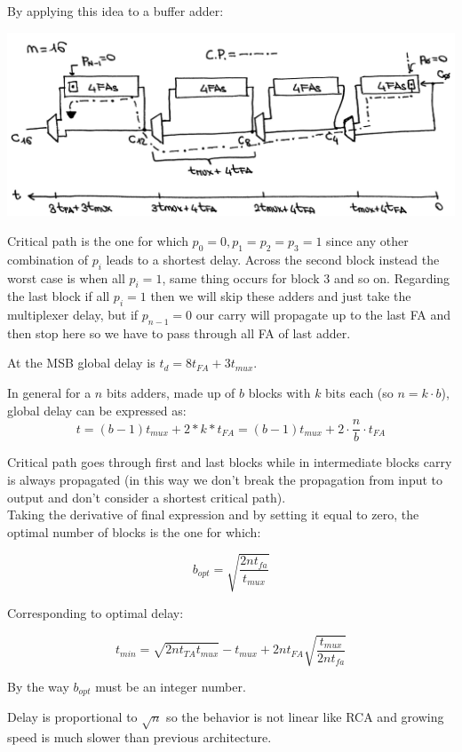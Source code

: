 By applying this idea to a buffer adder:

\begin{center}
  \includegraphics[width=0.8\linewidth]{img/img2/5}
\end{center}


Critical path is the one for which $p_0=0, p_1=p_2=p_3=1$ since any other combination of $p_i$ leads to a shortest delay. Across the second block instead the worst case is when all $p_i =1$, same thing occurs for block 3 and so on. Regarding the last block if all $p_i=1$ then we will skip these adders and just take the multiplexer delay, but if $p_{n-1}=0$ our carry will propagate up to the last FA and then stop here so we have to pass through all FA of last adder.

At the MSB global delay is $t_d=8t_{FA}+3t_{mux}$.

In general for a $n$ bits adders, made up of $b$ blocks with $k$ bits each (so $n=k \cdot b$), global delay can be expressed as:
$$t= (b-1)t_{mux} + 2 *k* t_{FA}= (b-1)t_{mux} + 2 \cdot \frac{n}{b} \cdot t_{FA}$$

Critical path goes through first and last blocks while in intermediate blocks carry is always propagated (in this way we don't break the propagation from input to output and don't consider a shortest critical path).\\
Taking the derivative of final expression and by setting it equal to zero, the optimal number of blocks is the one for which:

$$b_{opt}=\sqrt{\frac{2nt_{fa}}{t_{mux}}}$$

Corresponding to optimal delay:

$$t_{min}=\sqrt{2nt_{TA}t_{mux}}-t_{mux}+2nt_{FA} \sqrt{\frac{t_{mux}}{2nt_{fa}}}$$

By the way $b_{opt}$ must be an integer number.

Delay is proportional to $\sqrt{n}$ so the behavior is not linear like RCA and growing speed is much slower than previous architecture.\\

